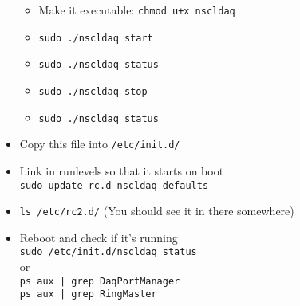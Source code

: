 \documentclass[11pt]{article}
\begin{document}
\begin{itemize}
\begin{itemize}
\begin{itemize}
\end{itemize}
\item Make it executable: \verb~chmod u+x nscldaq~
\item \verb~sudo ./nscldaq start~
\item \verb~sudo ./nscldaq status~
\item \verb~sudo ./nscldaq stop~
\item \verb~sudo ./nscldaq status~
\end{itemize}
\item Copy this file into \verb~/etc/init.d/~
\item Link in runlevels so that it starts on boot\\
    \verb~sudo update-rc.d nscldaq defaults~
\item \verb~ls /etc/rc2.d/~ (You should see it in there somewhere)
\item Reboot and check if it's running\\
    \verb~sudo /etc/init.d/nscldaq status~\\
    or\\
    \verb~ps aux | grep DaqPortManager~\\
    \verb~ps aux | grep RingMaster~
\end{itemize}
\end{document}
